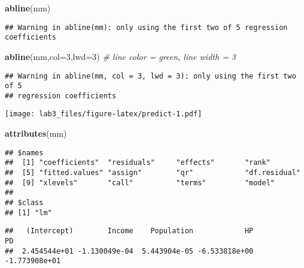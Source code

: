 \documentclass[
]{article}
\newenvironment{Shaded}{\begin{snugshade}}{\end{snugshade}}
\newcommand{\CommentTok}[1]{\textcolor[rgb]{0.56,0.35,0.01}{\textit{#1}}}
\newcommand{\DataTypeTok}[1]{\textcolor[rgb]{0.13,0.29,0.53}{#1}}
\newcommand{\DecValTok}[1]{\textcolor[rgb]{0.00,0.00,0.81}{#1}}
\newcommand{\KeywordTok}[1]{\textcolor[rgb]{0.13,0.29,0.53}{\textbf{#1}}}
\newcommand{\NormalTok}[1]{#1}
\newcommand{\OperatorTok}[1]{\textcolor[rgb]{0.81,0.36,0.00}{\textbf{#1}}}
\begin{document}
\begin{Shaded}
\begin{Highlighting}[]
\KeywordTok{abline}\NormalTok{(mm)}
\end{Highlighting}
\end{Shaded}

\begin{verbatim}
## Warning in abline(mm): only using the first two of 5 regression coefficients
\end{verbatim}

\begin{Shaded}
\begin{Highlighting}[]
\KeywordTok{abline}\NormalTok{(mm,}\DataTypeTok{col=}\DecValTok{3}\NormalTok{,}\DataTypeTok{lwd=}\DecValTok{3}\NormalTok{) }\CommentTok{# line color = green, line width = 3}
\end{Highlighting}
\end{Shaded}

\begin{verbatim}
## Warning in abline(mm, col = 3, lwd = 3): only using the first two of 5
## regression coefficients
\end{verbatim}

\texttt{[image: lab3\_files/figure-latex/predict-1.pdf]}

\begin{Shaded}
\begin{Highlighting}[]
\KeywordTok{attributes}\NormalTok{(mm)}
\end{Highlighting}
\end{Shaded}

\begin{verbatim}
## $names
##  [1] "coefficients"  "residuals"     "effects"       "rank"         
##  [5] "fitted.values" "assign"        "qr"            "df.residual"  
##  [9] "xlevels"       "call"          "terms"         "model"        
## 
## $class
## [1] "lm"
\end{verbatim}

\begin{Shaded}
\end{Shaded}

\begin{verbatim}
##   (Intercept)        Income    Population            HP            PD 
##  2.454544e+01 -1.130049e-04  5.443904e-05 -6.533818e+00 -1.773908e+01
\end{verbatim}
\end{document}
